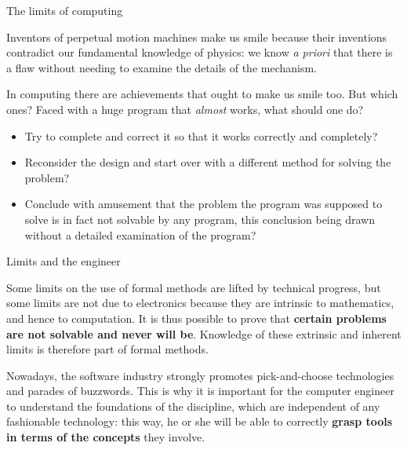\documentclass[compress,dvipdfmx]{beamer}
\begin{document}
%
\begin{frame}{The limits of computing}

  Inventors of perpetual motion machines make us smile because their
  inventions contradict our fundamental knowledge of physics: we know
  \emph{a priori} that there is a flaw without needing to examine the
  details of the mechanism.

  \bigskip

  In computing there are achievements that ought to make us smile
  too. But which ones? Faced with a huge program that \emph{almost}
  works, what should one do?
  \begin{itemize}

    \item Try to complete and correct it so that it works correctly
      and completely?

    \item Reconsider the design and start over with a different method
      for solving the problem?

    \item Conclude with amusement that the problem the program was
      supposed to solve is in fact not solvable by any program, this
      conclusion being drawn without a detailed examination of the
      program?

  \end{itemize}

\end{frame}

%
\begin{frame}{Limits and the engineer}

  Some limits on the use of formal methods are lifted by technical
  progress, but some limits are not due to electronics because they
  are intrinsic to mathematics, and hence to computation. It is thus
  possible to prove that \textbf{certain problems are not solvable and
    never will be}. Knowledge of these extrinsic and inherent limits
  is therefore part of formal methods.

  \bigskip

  Nowadays, the software industry strongly promotes
  pick\hyp{}and\hyp{}choose technologies and parades of
  buzzwords. This is why it is important for the computer engineer to
  understand the foundations of the discipline, which are independent
  of any fashionable technology: this way, he or she will be able to
  correctly \textbf{grasp tools in terms of the concepts} they
  involve.

\end{frame}
\end{document}
